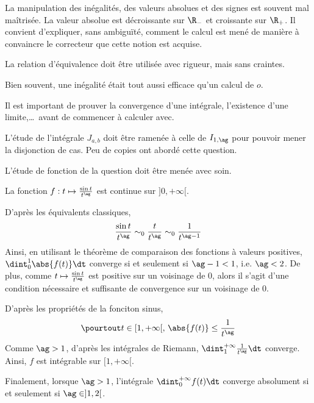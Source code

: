 \begin{solution}


\qu La manipulation des inégalités, des valeurs absolues et des signes est souvent mal maîtrisée. La valeur absolue est décroissante sur $\R_-$ et croissante sur $\R_+$. Il convient d'expliquer, sans ambiguïté, comment le calcul est mené de manière à convaincre le correcteur que cette notion est acquise.

\qu La relation d'équivalence doit être utilisée avec rigueur, mais sans craintes.

\qu Bien souvent, une inégalité était tout aussi efficace qu'un calcul de $o$.

\qu Il est important de prouver la convergence d'une intégrale, l'existence d'une limite,\ldots\, avant de commencer à calculer avec.

\qu L'étude de l'intégrale $J_{a,b}$ doit être ramenée à celle de $I_{1,\ag}$ pour pouvoir mener la disjonction de cas. Peu de copies ont abordé cette question.

\qu L'étude de fonction de la question  doit être menée avec soin.

\setcounter{cqu}{0}

\Qu La fonction $f : t \mapsto \frac{\sin t}{t^\ag}$ est continue sur $]0, +\infty[$.

 D'après les équivalents classiques,
\[
\frac{\sin t}{t^\ag} \sim_0 \frac{t}{t^\ag} \sim_0 \frac{1}{t^{\ag-1}}
\]
Ainsi, en utilisant le théorème de comparaison des fonctions à valeurs positives, $\dint_0^1 \abs{f(t)} \dt$ converge si et seulement si $\ag - 1 < 1$, i.e. $\ag < 2$. De plus, comme $t \mapsto \frac{\sin t}{t^\ag}$ est positive sur un voisinage de $0$, alors il s'agit d'une condition nécessaire et suffisante de convergence sur un voisinage de $0$.

 D'après les propriétés de la fonciton sinus,
\[
\pourtout t \in [1,+\infty[,\, \abs{f(t)} \leq \frac{1}{t^\ag}
\]
Comme $\ag > 1$, d'après les intégrales de Riemann, $\dint_1^{+\infty} \frac{1}{t^\ag} \dt$ converge. Ainsi, $f$ est intégrable sur $[1,+\infty[$.

Finalement, lorsque $\ag > 1$, l'intégrale $\dint_0^{+\infty} f(t) \dt$ converge absolument si et seulement si $\ag \in ]1, 2[$.


\end{solution}
